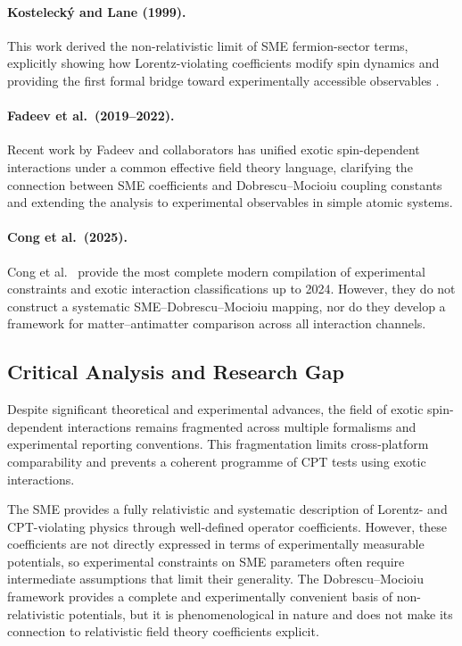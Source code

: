\documentclass[main]{subfiles}
\begin{document}
\paragraph{Kosteleck\'{y} and Lane (1999).}
This work derived the non-relativistic limit of SME fermion-sector terms,
explicitly showing how Lorentz-violating coefficients modify spin dynamics and
providing the first formal bridge toward experimentally accessible observables
\cite{KosteleckyLane1999}.

\paragraph{Fadeev et al.\ (2019--2022).}
Recent work by Fadeev and collaborators \cite{Fadeev2019,Fadeev2022} has
unified exotic spin-dependent interactions under a common effective field theory
language, clarifying the connection between SME coefficients and
Dobrescu--Mocioiu coupling constants and extending the analysis to experimental
observables in simple atomic systems.

\paragraph{Cong et al.\ (2025).}
Cong et al.\ \cite{Cong2025} provide the most complete modern compilation of
experimental constraints and exotic interaction classifications up to 2024.
However, they do not construct a systematic SME--Dobrescu--Mocioiu mapping, nor
do they develop a framework for matter--antimatter comparison across all
interaction channels.

\subsection{Critical Analysis and Research Gap}

Despite significant theoretical and experimental advances, the field of exotic
spin-dependent interactions remains fragmented across multiple formalisms and
experimental reporting conventions. This fragmentation limits cross-platform
comparability and prevents a coherent programme of CPT tests using exotic
interactions.

The SME provides a fully relativistic and systematic description of Lorentz-
and CPT-violating physics through well-defined operator coefficients. However,
these coefficients are not directly expressed in terms of experimentally
measurable potentials, so experimental constraints on SME parameters often
require intermediate assumptions that limit their generality. The
Dobrescu--Mocioiu framework provides a complete and experimentally convenient
basis of non-relativistic potentials, but it is phenomenological in nature and
does not make its connection to relativistic field theory coefficients explicit.
\end{document}
